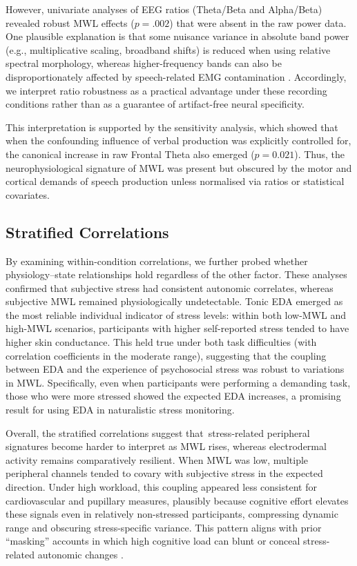 \documentclass[lettersize,journal]{IEEEtran}
\begin{document}
However, univariate analyses of EEG ratios (Theta/Beta and Alpha/Beta) revealed robust MWL effects ($p=.002$) that were absent in the raw power data. One plausible explanation is that some nuisance variance in absolute band power (e.g., multiplicative scaling, broadband shifts) is reduced when using relative spectral morphology, whereas higher-frequency bands can also be disproportionately affected by speech-related EMG contamination \cite{whithamScalpElectricalRecordingParalysis2007, deVosRemovalMuscleArtifactsSpokenLanguage2010}. Accordingly, we interpret ratio robustness as a practical advantage under these recording conditions rather than as a guarantee of artifact-free neural specificity.

This interpretation is supported by the sensitivity analysis, which showed that when the confounding influence of verbal production was explicitly controlled for, the canonical increase in raw Frontal Theta also emerged ($p=0.021$). Thus, the neurophysiological signature of MWL was present but obscured by the motor and cortical demands of speech production unless normalised via ratios or statistical covariates.

\subsection{Stratified Correlations}

By examining within-condition correlations, we further probed whether physiology–state relationships hold regardless of the other factor. These analyses confirmed that subjective stress had consistent autonomic correlates, whereas subjective MWL remained physiologically undetectable. Tonic EDA emerged as the most reliable individual indicator of stress levels: within both low-MWL and high-MWL scenarios, participants with higher self-reported stress tended to have higher skin conductance. This held true under both task difficulties (with correlation coefficients in the moderate range), suggesting that the coupling between EDA and the experience of psychosocial stress was robust to variations in MWL. Specifically, even when participants were performing a demanding task, those who were more stressed showed the expected EDA increases, a promising result for using EDA in naturalistic stress monitoring.

Overall, the stratified correlations suggest that \,stress-related peripheral signatures become harder to interpret as MWL rises, whereas electrodermal activity remains comparatively resilient. When MWL was low, multiple peripheral channels tended to covary with subjective stress in the expected direction. Under high workload, this coupling appeared less consistent for cardiovascular and pupillary measures, plausibly because cognitive effort elevates these signals even in relatively non-stressed participants, compressing dynamic range and obscuring stress-specific variance. This pattern aligns with prior ``masking'' accounts in which high cognitive load can blunt or conceal stress-related autonomic changes \cite{conwayEffectStressCognitive2013, setzDiscriminatingStressCognitive2010}.
\end{document}

